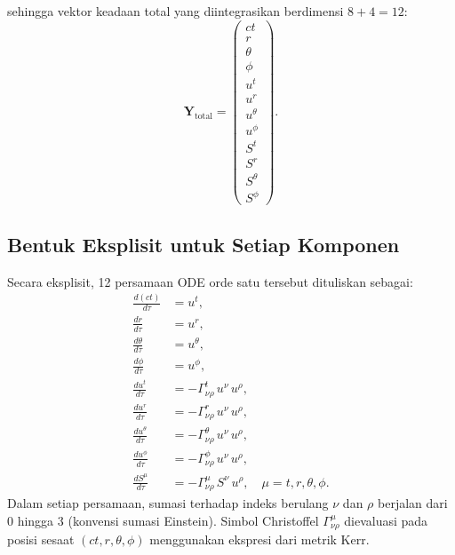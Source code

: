 sehingga vektor keadaan total yang diintegrasikan berdimensi $8 + 4 = 12$:
\begin{equation}
    \mathbf{Y}_{\text{total}} =
    \begin{pmatrix}
        ct \\ r \\ \theta \\ \phi \\
        u^t \\ u^r \\ u^\theta \\ u^\phi \\
        S^t \\ S^r \\ S^\theta \\ S^\phi
    \end{pmatrix}.
    \label{eq:state-vector-total}
\end{equation}


\subsection{Bentuk Eksplisit untuk Setiap Komponen}
\label{subsec:ode-eksplisit}

Secara eksplisit, 12 persamaan ODE orde satu tersebut dituliskan sebagai:
\begin{align}
    \frac{d(ct)}{d\tau} &= u^t, \label{eq:ode-ct}\\[3pt]
    \frac{dr}{d\tau} &= u^r, \label{eq:ode-r}\\[3pt]
    \frac{d\theta}{d\tau} &= u^\theta, \label{eq:ode-theta}\\[3pt]
    \frac{d\phi}{d\tau} &= u^\phi, \label{eq:ode-phi}\\[3pt]
    \frac{du^t}{d\tau} &= -\Gamma^t_{\nu\rho}\, u^\nu\, u^\rho, \label{eq:ode-ut}\\[3pt]
    \frac{du^r}{d\tau} &= -\Gamma^r_{\nu\rho}\, u^\nu\, u^\rho, \label{eq:ode-ur}\\[3pt]
    \frac{du^\theta}{d\tau} &= -\Gamma^\theta_{\nu\rho}\, u^\nu\, u^\rho, \label{eq:ode-utheta}\\[3pt]
    \frac{du^\phi}{d\tau} &= -\Gamma^\phi_{\nu\rho}\, u^\nu\, u^\rho, \label{eq:ode-uphi}\\[3pt]
    \frac{dS^\mu}{d\tau} &= -\Gamma^\mu_{\nu\rho}\, S^\nu\, u^\rho,
    \quad \mu = t, r, \theta, \phi. \label{eq:ode-spin}
\end{align}
Dalam setiap persamaan, sumasi terhadap indeks berulang $\nu$ dan $\rho$
berjalan dari 0 hingga 3 (konvensi sumasi Einstein).
Simbol Christoffel $\Gamma^\mu_{\nu\rho}$ dievaluasi pada posisi sesaat
$(ct, r, \theta, \phi)$ menggunakan ekspresi dari metrik Kerr.


